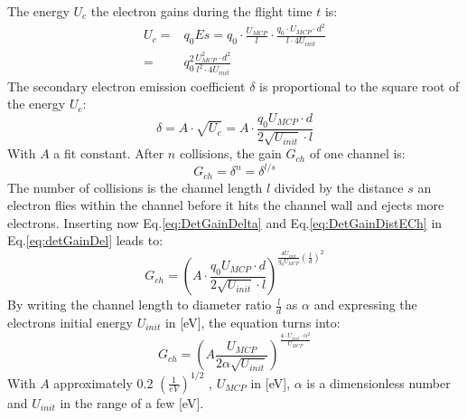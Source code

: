 	The energy $U_c$ the electron gains during the flight time $t$ is:
	\begin{align}
		U_c =& q_0 Es = q_0\cdot \frac{U_{MCP}}{l}\cdot\frac{q_0\cdot U_{MCP}\cdot d^2}{l\cdot 4 U_{init}}\\
		=& q_0^2 \frac{U_{MCP}^2\cdot d^2}{l^2\cdot 4U_{init}}
	\end{align}
	The secondary electron emission coefficient $\delta$ is proportional to the square root of the energy $U_c$:
	\begin{equation}
		\delta = A\cdot \sqrt{U_c} = A\cdot \frac{q_0 U_{MCP}\cdot d}{2 \sqrt{U_{init}}\cdot l}
		\label{eq:DetGainDelta}
	\end{equation}
	With $A$ a fit constant. After $n$ collisions, the gain $G_{ch}$ of one channel is:
	\begin{equation}
		G_{ch} = \delta^{n} = \delta^{l/s}
		\label{eq:detGainDel}
	\end{equation}
	The number of collisions is the channel length $l$ divided by the distance $s$ an electron flies within the channel before it hits the channel wall and ejects more electrons. Inserting now Eq.\eqref{eq:DetGainDelta} and Eq.\eqref{eq:DetGainDistECh} in Eq.\eqref{eq:detGainDel} leads to:
	\begin{equation}
		G_{ch} = \left(A\cdot\frac{q_0 U_{MCP} \cdot d}{2\sqrt{U_{init}}\cdot l}\right)^{\frac{4U_{init}}{q_0 U_{MCP}}\left(\frac{l}{d}\right)^2}
	\end{equation}
	By writing the channel length to diameter ratio $\frac{l}{d}$ as $\alpha$ and expressing the electrons initial energy $U_{init}$ in [eV], the equation turns into:
	\begin{equation}
		G_{ch} = \left(A\frac{U_{MCP}}{2\alpha\sqrt{U_{init}}}\right)^{\frac{4\cdot U_{init}\cdot\alpha^2}{U_{MCP}}}
	\end{equation}
	With $A$ approximately 0.2 $\left(\frac{1}{eV}\right)^{1/2}$ \cite{Wiza_1979_MCP}, $U_{MCP}$ in [eV], $\alpha$ is a dimensionless number and $U_{init}$ in the range of a few [eV].
	
	

